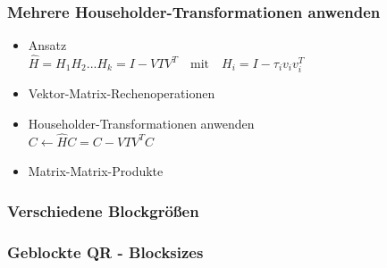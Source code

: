 \begin{frame}
	\frametitle{Mehrere Householder-Transformationen anwenden}	
	\vspace{-1cm}	
		\begin{itemize}
			\item Ansatz\\
			\vspace{0.3cm}
			$\hat{H} = H_1H_2...H_k = I - VTV^T \quad \text{mit}\quad H_i = I - \tau_i v_iv_i^T $
			\vspace{0.3cm}
			\item  Vektor-Matrix-Rechenoperationen
			\item Householder-Transformationen anwenden\\
			\vspace{0.3cm}
			$ C \leftarrow \hat{H} C = C - V T V^T C \quad $
			\item  Matrix-Matrix-Produkte
			
		\end{itemize}

		\vspace{-4cm}
		\hspace{9.6cm}
		\centering
		
\end{frame}



\begin{frame}
\frametitle{Verschiedene Blockgrößen}
		\centering
\end{frame}

\begin{frame}
\frametitle{Geblockte QR - Blocksizes}
	\centering
\end{frame}


